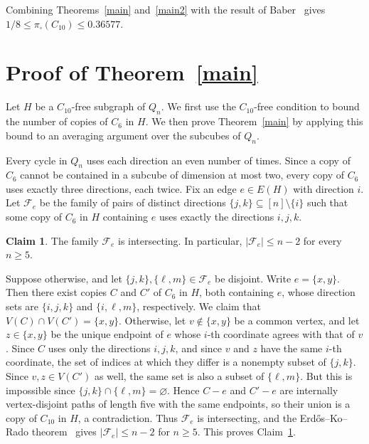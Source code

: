 \documentclass[11pt]{article}
\theoremstyle{plain}
\theoremstyle{definition}
\newtheorem{claim}[theorem]{Claim}
\begin{document}
Combining Theorems~\ref{main} and~\ref{main2} with the result of Baber~\cite{baber} gives $1/8 \leq \pi_{\square}(C_{10}) \leq 0.36577$.

\section{Proof of Theorem~\ref{main}}

Let $H$ be a $C_{10}$-free subgraph of $Q_n$. 
We first use the $C_{10}$-free condition to bound the number of copies of $C_6$ in $H$. 
We then prove Theorem~\ref{main} by applying this bound to an averaging argument over the subcubes of $Q_n$.

Every cycle in $Q_n$ uses each direction an even number of times. Since a copy of $C_6$ cannot be contained in a subcube of dimension at most two, every copy of $C_6$ uses exactly three directions, each twice. 
Fix an edge $e \in E(H)$ with direction $i$. 
Let $\mathcal{F}_e$ be the family of pairs of distinct directions $\{j,k\} \subseteq [n] \setminus \{i\}$ such that some copy of $C_6$ in $H$ containing $e$ uses exactly the directions $i,j,k$.

\begin{claim}\label{claim: intersect}
The family $\mathcal{F}_{e}$ is intersecting. In particular, $|\mathcal{F}_{e}| \leq n-2$ for every $n \geq 5$.

Suppose otherwise, and let $\{j,k\},\{\ell,m\} \in \mathcal{F}_e$ be
disjoint. 
Write $e = \{x,y\}$. 
Then there exist copies $C$ and $C'$ of $C_6$ in $H$, both containing $e$, whose direction sets are $\{i,j,k\}$ and $\{i,\ell,m\}$, respectively. 
We claim that $V(C) \cap V(C') = \{x,y\}$. 
Otherwise, let $v \notin \{x,y\}$ be a common vertex, and let $z \in \{x,y\}$ be the unique endpoint of $e$ whose $i$-th coordinate agrees with that of $v$.
Since $C$ uses only the directions $i,j,k$, and since $v$ and $z$ have the same $i$-th coordinate, the set of indices at which they differ is a nonempty subset of $\{j,k\}$.
Since $v,z \in V(C')$ as well, the same set is also a subset of $\{\ell,m\}$. 
But this is impossible since $\{j,k\} \cap \{\ell,m\} = \varnothing$. 
Hence $C - e$ and $C' - e$ are internally vertex-disjoint paths of length
five with the same endpoints, so their union is a copy of $C_{10}$ in
$H$, a contradiction. 
Thus $\mathcal{F}_e$ is intersecting, and the Erd\H{o}s--Ko--Rado theorem~\cite{EKR} gives $|\mathcal{F}_e| \leq n-2$ for $n \geq 5$.
This proves Claim~\ref{claim: intersect}.

\end{claim}
\end{document}
